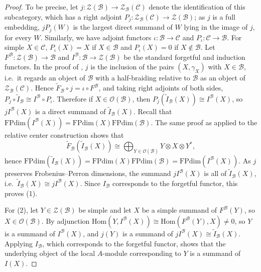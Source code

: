 \documentclass[10pt]{article}
\theoremstyle{plain}
\theoremstyle{definition}
\theoremstyle{plain}
\begin{document}
\begin{proof}
\par To be precise, let $j:\mathcal{Z}(\mathcal{B})\to\mathcal{Z}_\mathcal{B}(\mathcal{C})$ denote the identification of this subcategory, which has a right adjoint $P_j:\mathcal{Z}_\mathcal{B}(\mathcal{C})\to\mathcal{Z}(\mathcal{B})$; as $j$ is a full embedding, $jP_j(W)$ is the largest direct summand of $W$ lying in the image of $j$, for every $W$.  Similarly, we have adjoint functors $\iota:\mathcal{B}\to\mathcal{C}$ and $P_\iota:\mathcal{C}\to\mathcal{B}$.  For simple $X\in\mathcal{C}$, $P_\iota(X)=X$ if $X\in\mathcal{B}$ and $P_\iota(X)=0$ if $X\not\in\mathcal{B}$. Let $F^\mathcal{B}:\mathcal{Z}(\mathcal{B})\to\mathcal{B}$ and $I^\mathcal{B}:\mathcal{B}\to\mathcal{Z}(\mathcal{B})$ be the standard forgetful and induction functors.  In the proof of \cite[Theorem 4.10]{MR3039775}, $j$ is the inclusion of the pairs $(X,\gamma_X)$ with $X\in\mathcal{B}$, i.e.\ it regards an object of $\mathcal{B}$ with a half-braiding relative to $\mathcal{B}$ as an object of $\mathcal{Z}_\mathcal{B}(\mathcal{C})$. Hence $\widetilde{F}_\mathcal{B}\circ j=\iota\circ F^\mathcal{B}$, and taking right adjoints of both sides, $P_j\circ\widetilde{I}_\mathcal{B}\cong I^\mathcal{B}\circ P_\iota$. Therefore if $X\in\mathcal{O}(\mathcal{B})$, then $P_j(\widetilde{I}_\mathcal{B}(X))\cong I^\mathcal{B}(X)$, so $jI^\mathcal{B}(X)$ is a direct summand of $\widetilde{I}_\mathcal{B}(X)$.  Recall that $\mathrm{FPdim}(I^\mathcal{B}(X))=\mathrm{FPdim}(X)\mathrm{FPdim}(\mathcal{B})$.  The same proof as \cite[Proposition 5.4]{MR2183279} applied to the relative center construction shows that
\begin{equation}
    \widetilde{F}_\mathcal{B}(\widetilde{I}_\mathcal{B}(X))\cong\bigoplus_{Y\in\mathcal{O}(\mathcal{B})}Y\otimes X\otimes Y^\ast,
\end{equation}
hence $\mathrm{FPdim}(\widetilde{I}_\mathcal{B}(X))=\mathrm{FPdim}(X)\mathrm{FPdim}(\mathcal{B})=\mathrm{FPdim}(I^\mathcal{B}(X))$.  As $j$ preserves Frobenius--Perron dimensions, the summand $jI^\mathcal{B}(X)$ is all of $\widetilde{I}_\mathcal{B}(X)$, i.e.\ $\widetilde{I}_\mathcal{B}(X)\cong jI^\mathcal{B}(X)$.  Since $I_\mathcal{B}$ corresponds to the forgetful functor, this proves (1).

\par For (2), let $Y\in\mathcal{Z}(\mathcal{B})$ be simple and let $X$ be a simple summand of $F^\mathcal{B}(Y)$, so $X\in\mathcal{O}(\mathcal{B})$.  By adjunction $\mathrm{Hom}(Y,I^\mathcal{B}(X))\cong\mathrm{Hom}(F^\mathcal{B}(Y),X)\neq0$, so $Y$ is a summand of $I^\mathcal{B}(X)$, and $j(Y)$ is a summand of $jI^\mathcal{B}(X)\cong\widetilde{I}_\mathcal{B}(X)$.  Applying $I_\mathcal{B}$, which corresponds to the forgetful functor, shows that the underlying object of the local $A$-module corresponding to $Y$ is a summand of $I(X)$.
\end{proof}
\end{document}
